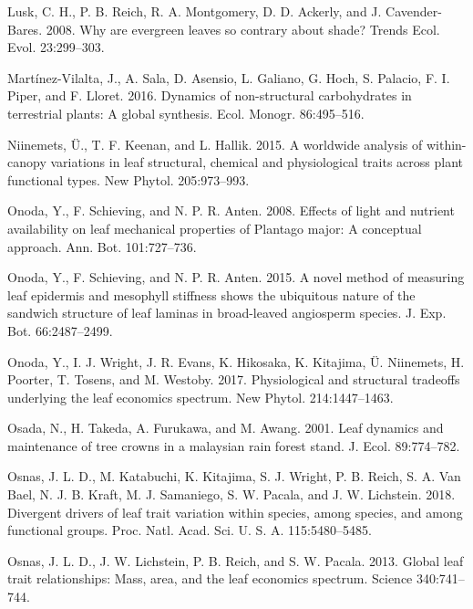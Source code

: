 \documentclass[
  12pt,
]{article}
\newlength{\cslhangindent}
\newenvironment{cslreferences}%
  {\setlength{\parindent}{0pt}%
  \everypar{\setlength{\hangindent}{\cslhangindent}}\ignorespaces}%
  {\par}
\begin{document}
\begin{cslreferences}
\leavevmode\hypertarget{ref-Lusk2008}{}%
Lusk, C. H., P. B. Reich, R. A. Montgomery, D. D. Ackerly, and J. Cavender-Bares. 2008. Why are evergreen leaves so contrary about shade? Trends Ecol. Evol. 23:299--303.

\leavevmode\hypertarget{ref-Martinez-Vilalta2016}{}%
Martínez-Vilalta, J., A. Sala, D. Asensio, L. Galiano, G. Hoch, S. Palacio, F. I. Piper, and F. Lloret. 2016. Dynamics of non-structural carbohydrates in terrestrial plants: A global synthesis. Ecol. Monogr. 86:495--516.

\leavevmode\hypertarget{ref-Niinemets2015}{}%
Niinemets, Ü., T. F. Keenan, and L. Hallik. 2015. A worldwide analysis of within-canopy variations in leaf structural, chemical and physiological traits across plant functional types. New Phytol. 205:973--993.

\leavevmode\hypertarget{ref-Onoda2008}{}%
Onoda, Y., F. Schieving, and N. P. R. Anten. 2008. Effects of light and nutrient availability on leaf mechanical properties of Plantago major: A conceptual approach. Ann. Bot. 101:727--736.

\leavevmode\hypertarget{ref-Onoda2015}{}%
Onoda, Y., F. Schieving, and N. P. R. Anten. 2015. A novel method of measuring leaf epidermis and mesophyll stiffness shows the ubiquitous nature of the sandwich structure of leaf laminas in broad-leaved angiosperm species. J. Exp. Bot. 66:2487--2499.

\leavevmode\hypertarget{ref-Onoda2017}{}%
Onoda, Y., I. J. Wright, J. R. Evans, K. Hikosaka, K. Kitajima, Ü. Niinemets, H. Poorter, T. Tosens, and M. Westoby. 2017. Physiological and structural tradeoffs underlying the leaf economics spectrum. New Phytol. 214:1447--1463.

\leavevmode\hypertarget{ref-Osada2001}{}%
Osada, N., H. Takeda, A. Furukawa, and M. Awang. 2001. Leaf dynamics and maintenance of tree crowns in a malaysian rain forest stand. J. Ecol. 89:774--782.

\leavevmode\hypertarget{ref-Osnas2018}{}%
Osnas, J. L. D., M. Katabuchi, K. Kitajima, S. J. Wright, P. B. Reich, S. A. Van Bael, N. J. B. Kraft, M. J. Samaniego, S. W. Pacala, and J. W. Lichstein. 2018. Divergent drivers of leaf trait variation within species, among species, and among functional groups. Proc. Natl. Acad. Sci. U. S. A. 115:5480--5485.

\leavevmode\hypertarget{ref-Osnas2013}{}%
Osnas, J. L. D., J. W. Lichstein, P. B. Reich, and S. W. Pacala. 2013. Global leaf trait relationships: Mass, area, and the leaf economics spectrum. Science 340:741--744.


\end{cslreferences}
\end{document}
